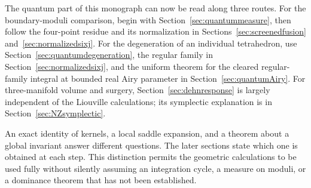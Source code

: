 The quantum part of this monograph can now be read along three routes.
For the boundary-moduli comparison, begin with
Section~\ref{sec:quantummeasure}, then follow the four-point residue
and its normalization in Sections~\ref{sec:screenedfusion}
and~\ref{sec:normalizedsixj}. For the degeneration of an individual
tetrahedron, use Section~\ref{sec:quantumdegeneration}, the regular
family in Section~\ref{sec:normalizedsixj}, and the uniform theorem for the cleared regular-family integral
at bounded real Airy parameter in Section~\ref{sec:quantumAiry}. For three-manifold volume
and surgery, Section~\ref{sec:dehnresponse} is largely independent
of the Liouville calculations; its symplectic explanation is in
Section~\ref{sec:NZsymplectic}.

An exact identity of kernels, a local saddle expansion, and a
theorem about a global invariant answer different questions. The
later sections state which one is obtained at each step. This
distinction permits the geometric calculations to be used fully
without silently assuming an integration cycle, a measure on
moduli, or a dominance theorem that has not been established.
